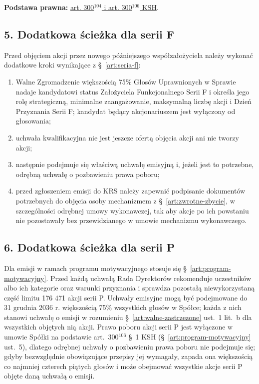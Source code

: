 \documentclass[12pt,a4paper]{report}
\begin{document}
\textbf{Podstawa prawna:} \href{https://eli.gov.pl/api/acts/DU/2024/18/text.html}{art. 300$^{104}$ i art. 300$^{106}$ KSH}.

\subsection*{5. Dodatkowa ścieżka dla serii F}

Przed objęciem akcji przez nowego późniejszego współzałożyciela należy wykonać dodatkowe kroki wynikające z §~\ref{art:seria-f}:
\begin{enumerate}
  \item Walne Zgromadzenie większością 75\% Głosów Uprawnionych w Sprawie nadaje kandydatowi status Założyciela Funkcjonalnego Serii F i określa jego rolę strategiczną, minimalne zaangażowanie, maksymalną liczbę akcji i Dzień Przyznania Serii F; kandydat będący akcjonariuszem jest wyłączony od głosowania;
  \item uchwała kwalifikacyjna nie jest jeszcze ofertą objęcia akcji ani nie tworzy akcji;
  \item następnie podejmuje się właściwą uchwałę emisyjną i, jeżeli jest to potrzebne, odrębną uchwałę o pozbawieniu prawa poboru;
  \item przed zgłoszeniem emisji do KRS należy zapewnić podpisanie dokumentów potrzebnych do objęcia osoby mechanizmem z §~\ref{art:zwrotne-zbycie}, w szczególności odrębnej umowy wykonawczej, tak aby akcje po ich powstaniu nie pozostawały bez przewidzianego w umowie mechanizmu wykonawczego.
\end{enumerate}

\subsection*{6. Dodatkowa ścieżka dla serii P}

Dla emisji w ramach programu motywacyjnego stosuje się §~\ref{art:program-motywacyjny}. Przed każdą uchwałą Rada Dyrektorów rekomenduje uczestników albo ich kategorie oraz warunki przyznania i sprawdza pozostałą niewykorzystaną część limitu 176 471 akcji serii P. Uchwały emisyjne mogą być podejmowane do 31 grudnia 2036 r. większością 75\% wszystkich głosów w Spółce; każda z nich stanowi uchwałę o emisji w rozumieniu §~\ref{art:walne-zastrzezone} ust.~1 lit.~b dla wszystkich objętych nią akcji. Prawo poboru akcji serii P jest wyłączone w umowie Spółki na podstawie art.~300$^{106}$ §~1 KSH (§~\ref{art:program-motywacyjny} ust.~5), dlatego odrębnej uchwały o pozbawieniu prawa poboru nie podejmuje się; gdyby bezwzględnie obowiązujące przepisy jej wymagały, zapada ona większością co najmniej czterech piątych głosów i może obejmować wszystkie akcje serii P objęte daną uchwałą o emisji.
\end{document}

